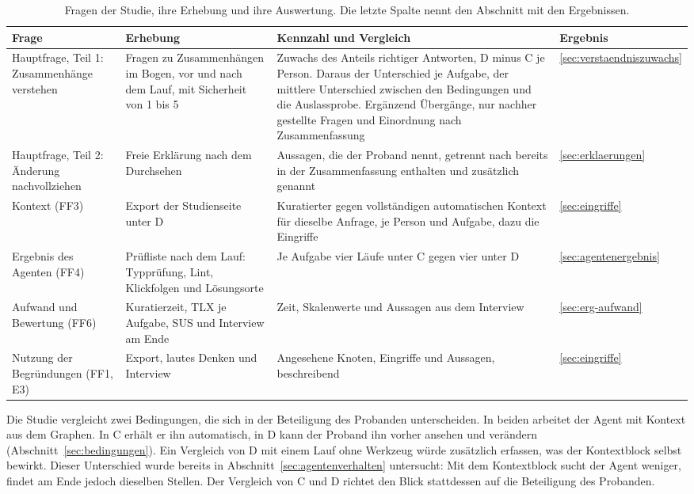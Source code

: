 \begin{table}[H]
  \centering
  \caption{Fragen der Studie, ihre Erhebung und ihre Auswertung. Die letzte Spalte nennt den Abschnitt mit den Ergebnissen.}
  \label{tab:studienfragen}
  \small
  \begin{tabularx}{\textwidth}{>{\raggedright\arraybackslash}p{2.7cm}>{\raggedright\arraybackslash}X>{\raggedright\arraybackslash}Xl}
    \toprule
    Frage & Erhebung & Kennzahl und Vergleich & Ergebnis \\
    \midrule
    Hauptfrage, Teil 1: Zusammenhänge verstehen & Fragen zu Zusammenhängen im Bogen, vor und nach dem Lauf, mit Sicherheit von 1 bis 5 & Zuwachs des Anteils richtiger Antworten, D minus C je Person. Daraus der Unterschied je Aufgabe, der mittlere Unterschied zwischen den Bedingungen und die Auslassprobe. Ergänzend Übergänge, nur nachher gestellte Fragen und Einordnung nach Zusammenfassung & \ref{sec:verstaendniszuwachs} \\
    Hauptfrage, Teil 2: Änderung nachvollziehen & Freie Erklärung nach dem Durchsehen & Aussagen, die der Proband nennt, getrennt nach bereits in der Zusammenfassung enthalten und zusätzlich genannt & \ref{sec:erklaerungen} \\
    Kontext (FF3) & Export der Studienseite unter D & Kuratierter gegen vollständigen automatischen Kontext für dieselbe Anfrage, je Person und Aufgabe, dazu die Eingriffe & \ref{sec:eingriffe} \\
    Ergebnis des Agenten (FF4) & Prüfliste nach dem Lauf: Typprüfung, Lint, Klickfolgen und Lösungsorte & Je Aufgabe vier Läufe unter C gegen vier unter D & \ref{sec:agentenergebnis} \\
    Aufwand und Bewertung (FF6) & Kuratierzeit, TLX je Aufgabe, SUS und Interview am Ende & Zeit, Skalenwerte und Aussagen aus dem Interview & \ref{sec:erg-aufwand} \\
    Nutzung der Begründungen (FF1, E3) & Export, lautes Denken und Interview & Angesehene Knoten, Eingriffe und Aussagen, beschreibend & \ref{sec:eingriffe} \\
    \bottomrule
  \end{tabularx}
\end{table}

Die Studie vergleicht zwei Bedingungen, die sich in der Beteiligung des Probanden unterscheiden. In beiden arbeitet der Agent mit Kontext aus dem Graphen. In C erhält er ihn automatisch, in D kann der Proband ihn vorher ansehen und verändern (Abschnitt~\ref{sec:bedingungen}). Ein Vergleich von D mit einem Lauf ohne Werkzeug würde zusätzlich erfassen, was der Kontextblock selbst bewirkt. Dieser Unterschied wurde bereits in Abschnitt~\ref{sec:agentenverhalten} untersucht: Mit dem Kontextblock sucht der Agent weniger, findet am Ende jedoch dieselben Stellen. Der Vergleich von C und D richtet den Blick stattdessen auf die Beteiligung des Probanden.

